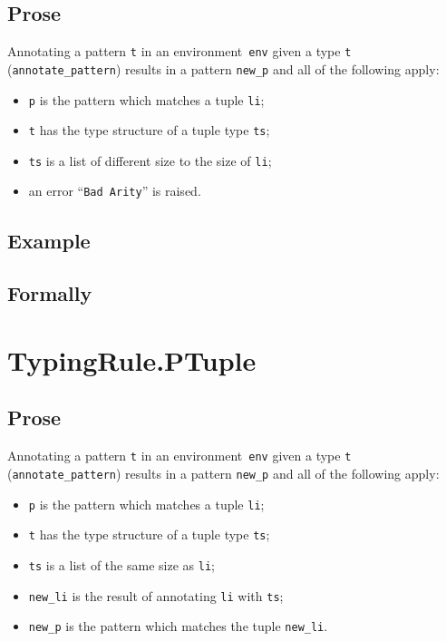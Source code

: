 \documentclass{book}
\begin{document}
\begin{itemize}
  \subsection{Prose}
   Annotating a pattern \texttt{t} in an environment~\texttt{env} given a type \texttt{t} (\texttt{annotate\_pattern}) results in a pattern \texttt{new\_p} and all of the following apply:
   \begin{itemize}
   \item \texttt{p} is the pattern which matches a tuple \texttt{li};
   \item \texttt{t} has the type structure of a tuple type \texttt{ts};
   \item \texttt{ts} is a list of different size to the size of \texttt{li};
   \item an error ``\texttt{Bad Arity}'' is raised.
   \end{itemize}

  \subsection{Example}



\begin{emptyformal}
    \subsection{Formally}
\end{emptyformal}



\section{TypingRule.PTuple \label{sec:TypingRule.PTuple}}

  \subsection{Prose}
   Annotating a pattern \texttt{t} in an environment~\texttt{env} given a type \texttt{t} (\texttt{annotate\_pattern}) results in a pattern \texttt{new\_p} and all of the following apply:
   \begin{itemize}
   \item \texttt{p} is the pattern which matches a tuple \texttt{li};
   \item \texttt{t} has the type structure of a tuple type \texttt{ts};
   \item \texttt{ts} is a list of the same size as \texttt{li};
   \item \texttt{new\_li} is the result of annotating \texttt{li} with \texttt{ts};
   \item \texttt{new\_p} is the pattern which matches the tuple \texttt{new\_li}.
   \end{itemize}


\end{itemize}
\end{document}
